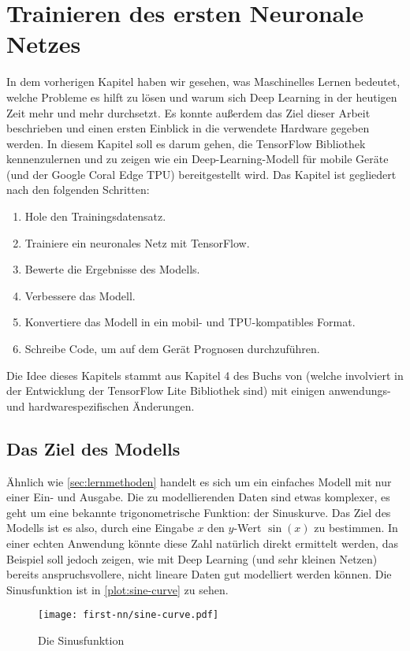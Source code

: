 \chapter{Trainieren des ersten Neuronale Netzes}
In dem vorherigen Kapitel haben wir gesehen,
was Maschinelles Lernen bedeutet, welche
Probleme es hilft zu lösen und warum sich
Deep Learning in der heutigen Zeit mehr und mehr durchsetzt.
Es konnte außerdem das Ziel dieser Arbeit
beschrieben und einen ersten Einblick
in die verwendete Hardware gegeben werden.
In diesem Kapitel soll es darum gehen, die
TensorFlow Bibliothek kennenzulernen
und zu zeigen wie ein Deep-Learning-Modell
für mobile Geräte (und der Google Coral Edge TPU) bereitgestellt wird.
Das Kapitel ist gegliedert nach den folgenden Schritten:
\begin{enumerate}
  \item Hole den Trainingsdatensatz.
  \item Trainiere ein neuronales Netz mit TensorFlow.
  \item Bewerte die Ergebnisse des Modells.
  \item Verbessere das Modell.
  \item Konvertiere das Modell in ein mobil- und TPU-kompatibles Format.
  \item Schreibe Code, um auf dem Gerät Prognosen durchzuführen.
\end{enumerate}
Die Idee dieses Kapitels stammt aus Kapitel 4 des Buchs 
von \textcite{book:tiny-ml} (welche involviert in der Entwicklung
der TensorFlow Lite Bibliothek sind) mit einigen
anwendungs- und hardwarespezifischen Änderungen.

\section{Das Ziel des Modells}
Ähnlich wie \autoref{sec:lernmethoden} handelt es sich
um ein einfaches Modell mit nur einer Ein- und Ausgabe.
Die zu modellierenden Daten sind etwas komplexer,
es geht um eine bekannte trigonometrische Funktion: der Sinuskurve.
Das Ziel des Modells ist es also, durch eine Eingabe $x$
den $y$-Wert $\sin(x)$ zu bestimmen.
In einer echten Anwendung könnte
diese Zahl natürlich direkt ermittelt werden,
das Beispiel soll jedoch zeigen,
wie mit Deep Learning (und sehr kleinen Netzen)
bereits anspruchsvollere, nicht lineare Daten gut modelliert werden können.
Die Sinusfunktion ist in \autoref{plot:sine-curve} zu sehen.
\begin{figure}[!h]
  \centering
  \texttt{[image: first-nn/sine-curve.pdf]}
  \caption{Die Sinusfunktion}
  \label{plot:sine-curve}
\end{figure}

